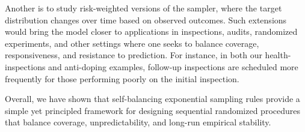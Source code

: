Another is to study risk-weighted versions of the sampler, where the target distribution changes
over time based on observed outcomes. Such extensions would bring the model closer to applications in inspections, audits, randomized experiments, and other settings where one seeks to balance coverage, responsiveness, and resistance to prediction. For instance, in both our health-inspections and anti-doping examples, follow-up inspections are scheduled more frequently for those performing poorly on the initial inspection.

Overall, we have shown that self-balancing exponential sampling rules provide a simple yet principled framework for designing sequential randomized procedures that balance coverage, unpredictability, and long-run empirical stability.



